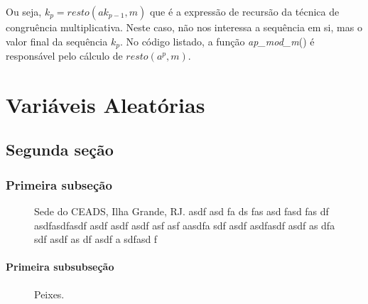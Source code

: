 \documentclass[a4paper,12pt,oneside,onecolumn]{uerj/uerj}
\begin{document}
Ou seja, $k_p = resto(ak_{p-1},m)$ que é a expressão de recursão da técnica de congruência multiplicativa. Neste caso, não nos interessa a sequência em si, mas o valor final da sequência $k_p$. No código listado, a função \emph{ap\_mod\_m}() é responsável pelo cálculo de $resto(a^{p},m)$.

\chapter{Variáveis Aleatórias}

\section{Segunda seção}

\subsection{Primeira subseção}

\begin{figure}[ht]
  \centering
  \caption{Sede do CEADS, Ilha Grande, RJ. asdf asd fa ds fas asd fasd fas df asdfasdfasdf asdf asdf asdf asf asf aasdfa sdf   asdf asdfasdf asdf as dfa sdf asdf as df asdf a sdfasd f}
  \label{fig:ceads1}
\end{figure}

\subsubsection{Primeira subsubseção}

\begin{figure}[ht]
  \centering
  \caption{Peixes.}
  \label{fig:peixes}
\end{figure}
\end{document}
